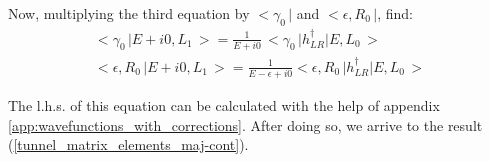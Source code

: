 Now, multiplying the third equation by $ \big<\gamma_{0}\,\big| $ and $ \big<\epsilon,R_{0}\,\big |$, find:
\begin{gather}
\big<\gamma_{0}\,\big|E+i0,L_{1}\,\big>=\frac{1}{E+i0}\,\big<\gamma_{0}\,\big|h_{LR}^{\dagger}\big|E,L_{0}\,\big>
\\
\big<\epsilon,R_{0}\,\big|E+i0,L_{1}\,\big>=\frac{1}{E-\epsilon+i0}\big<\epsilon,R_{0}\,\big|h_{LR}^{\dagger}\big|E,L_{0}\,\big>
\end{gather}

The l.h.s. of this equation can be calculated with the help of appendix \ref{app:wavefunctions_with_corrections}. After doing so, we arrive to the result (\ref{tunnel_matrix_elements_maj-cont}).
